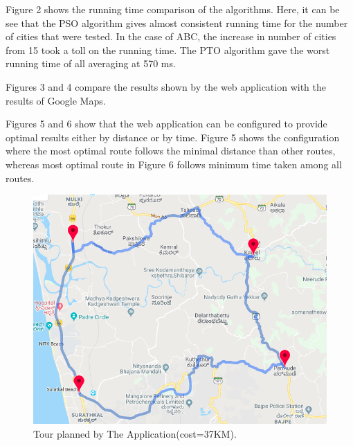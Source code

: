\documentclass[conference]{IEEEtran}
\begin{document}
Figure 2 shows the running time comparison of the algorithms. Here, it can be see that the PSO algorithm gives almost consistent running time for the number of cities that were tested. In the case of ABC, the increase in number of cities from 15 took a toll on the running time. The PTO algorithm gave the worst running time of all averaging at 570 ms. 

Figures 3 and 4 compare the results shown by the web application with the results of Google Maps. 

Figures 5 and 6 show that the web application can be configured to provide optimal results either by distance or by time. Figure 5 shows the configuration where the most optimal route follows the minimal distance than other routes, whereas most optimal route in Figure 6 follows minimum time taken among all routes.


\begin{figure}[htbp]
\centerline{\includegraphics[width=\columnwidth]{tspResultApp.png}}
\caption{Tour planned by The Application(cost=37KM).}
\label{fig3}
\end{figure}
\end{document}
